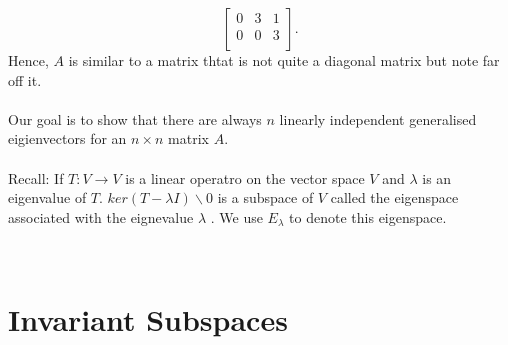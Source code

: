 \documentclass{report}
\begin{document}
{\[\begin{bmatrix}
	 0 & 3 & 1\\
	 0 & 0 & 3\\
	 \end{bmatrix}
 .\] 
 Hence, $A$ is similar to a matrix thtat is not quite a diagonal matrix but note far off it.\\
 \\
 Our goal is to show that there are always $ n$ linearly independent generalised eigienvectors for an $n \times n$  matrix $ A$.\\
 \\
 Recall: If $ T: V \to V$ is a linear operatro on the vector space $ V$ and $ \lambda $ is an eigenvalue of $ T$. $ ker \left( T - \lambda I \right) \backslash {0} $  is a subspace of $ V$ called the eigenspace associated with the eignevalue $ \lambda$ . We use $ E_{ \lambda}$  to denote this eigenspace.

}

\\
\section{Invariant Subspaces}
	
                   
\end{document}
